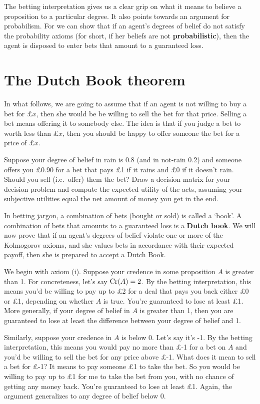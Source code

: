 The betting interpretation gives us a clear grip on what it means to
believe a proposition to a particular degree. It also points towards
an argument for probabilism. For we can show that if an agent's
degrees of belief do not satisfy the probability axioms (for short, if
her beliefs are not \textbf{probabilistic}), then the agent is
disposed to enter bets that amount to a guaranteed loss.

\section{The Dutch Book theorem}

In what follows, we are going to assume that if an agent is not
willing to buy a bet for £$x$, then she would be be willing to sell
the bet for that price. Selling a bet means offering it to somebody
else. The idea is that if you judge a bet to worth less than £$x$,
then you should be happy to offer someone the bet for a price of £$x$.

\begin{exercise1}
  Suppose your degree of belief in rain is $0.8$ (and in not-rain 0.2)
  and someone offers you £0.90 for a bet that pays £1 if it rains and
  £0 if it doesn't rain. Should you sell (i.e.\ offer) them the bet?
  Draw a decision matrix for your decision problem and compute the
  expected utility of the acts, assuming your subjective utilities
  equal the net amount of money you get in the end.
\end{exercise1}

In betting jargon, a combination of bets (bought or sold) is called a
`book'. A combination of bets that amounts to a guaranteed loss is a
\textbf{Dutch book}. We will now prove that if an agent's degrees of
belief violate one or more of the Kolmogorov axioms, and she values
bets in accordance with their expected payoff, then she is prepared to
accept a Dutch Book.

We begin with axiom (i). Suppose your credence in some proposition $A$
is greater than 1. For concreteness, let's say $\text{Cr}(A)=2$. By the
betting interpretation, this means you'd be willing to pay up to £2
for a deal that pays you back either £0 or £1, depending on whether
$A$ is true. You're guaranteed to lose at least £1. More generally, if
your degree of belief in $A$ is greater than 1, then you are
guaranteed to lose at least the difference between your degree of
belief and 1.

Similarly, suppose your credence in $A$ is below 0. Let's say it's
-1. By the betting interpretation, this means you would pay no more
than £-1 for a bet on $A$ and you'd be willing to sell the bet for any
price above £-1. What does it mean to sell a bet for £-1?  It means to
pay someone £1 to take the bet. So you would be willing to pay up to
£1 for me to take the bet from you, with no chance of getting any
money back. You're guaranteed to lose at least £1. Again, the argument
generalizes to any degree of belief below 0.

